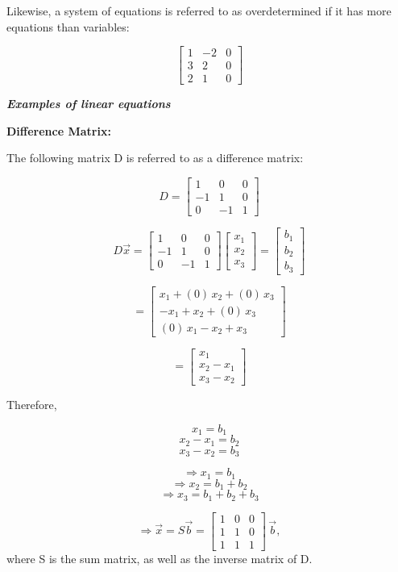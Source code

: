 \documentclass{article}
\begin{document}
Likewise, a system of equations is referred to as overdetermined if it
has more equations than variables:

\[\left[\begin{array}{cc|c} 1 & -2 & 0 \\ 3 & 2 & 0 \\ 2 & 1 & 0 \end{array}\right]\]

    \textbf{\emph{Examples of linear equations}}

\textbf{Difference Matrix:}

The following matrix D is referred to as a difference matrix:

\[D = \begin{bmatrix}  1 & 0 & 0 \\ -1 & 1 & 0 \\ 0 & -1 & 1 \end{bmatrix}\]

\[D\vec{x} = \begin{bmatrix}  1 & 0 & 0 \\ -1 & 1 & 0 \\ 0 & -1 & 1 \end{bmatrix} \begin{bmatrix}  x_1 \\ x_2 \\ x_3 \end{bmatrix} = \begin{bmatrix}  b_1 \\ b_2 \\ b_3 \end{bmatrix}\]

\[ = \begin{bmatrix}  x_1 + (0) \, x_2 + (0) \, x_3 \\  -x_1 + x_2 + (0) \, x_3 \\ (0) \, x_1 - x_2 + x_3 \end{bmatrix} \]

\[ = \begin{bmatrix}  x_1 \\ x_2 - x_1 \\ x_3 - x_2 \end{bmatrix}\]

Therefore,

\[ x_1 = b_1 \] \[ x_2 - x_1 = b_2\] \[ x_3 - x_2 = b_3\]

\[\Rightarrow x_1 = b_1 \] \[\Rightarrow x_2 = b_1 + b_2\]
\[\Rightarrow x_3 = b_1 + b_2 +b_3\]

\[\Rightarrow \vec{x} = S \vec{b} = \begin{bmatrix} 1 & 0 & 0 \\ 1 & 1 & 0 \\ 1 & 1 & 1 \end{bmatrix} \, \vec{b}, \]
where S is the sum matrix, as well as the inverse matrix of D.
\end{document}
